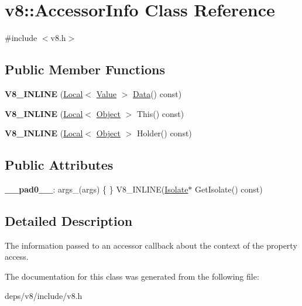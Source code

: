 \hypertarget{classv8_1_1_accessor_info}{}\section{v8\+:\+:Accessor\+Info Class Reference}
\label{classv8_1_1_accessor_info}


{\ttfamily \#include $<$v8.\+h$>$}

\subsection*{Public Member Functions}
\begin{DoxyCompactItemize}
\item 
\hypertarget{classv8_1_1_accessor_info_aaf108fa9b88e0c486d6c1e211422073a}{}{\bfseries V8\+\_\+\+I\+N\+L\+I\+N\+E} (\hyperlink{classv8_1_1_local}{Local}$<$ \hyperlink{classv8_1_1_value}{Value} $>$ \hyperlink{classv8_1_1_data}{Data}() const)\label{classv8_1_1_accessor_info_aaf108fa9b88e0c486d6c1e211422073a}

\item 
\hypertarget{classv8_1_1_accessor_info_ae25d9f1f25fe40f24fc39966632a2901}{}{\bfseries V8\+\_\+\+I\+N\+L\+I\+N\+E} (\hyperlink{classv8_1_1_local}{Local}$<$ \hyperlink{classv8_1_1_object}{Object} $>$ This() const)\label{classv8_1_1_accessor_info_ae25d9f1f25fe40f24fc39966632a2901}

\item 
\hypertarget{classv8_1_1_accessor_info_a805917deb22cf10270b844b498e73172}{}{\bfseries V8\+\_\+\+I\+N\+L\+I\+N\+E} (\hyperlink{classv8_1_1_local}{Local}$<$ \hyperlink{classv8_1_1_object}{Object} $>$ Holder() const)\label{classv8_1_1_accessor_info_a805917deb22cf10270b844b498e73172}

\end{DoxyCompactItemize}
\subsection*{Public Attributes}
\begin{DoxyCompactItemize}
\item 
\hypertarget{classv8_1_1_accessor_info_ac4db6a6ff509053620383df164726cf5}{}{\bfseries \+\_\+\+\_\+pad0\+\_\+\+\_\+}\+: args\+\_\+(args) \{ \} V8\+\_\+\+I\+N\+L\+I\+N\+E(\hyperlink{classv8_1_1_isolate}{Isolate}$\ast$ Get\+Isolate() const)\label{classv8_1_1_accessor_info_ac4db6a6ff509053620383df164726cf5}

\end{DoxyCompactItemize}


\subsection{Detailed Description}
The information passed to an accessor callback about the context of the property access. 

The documentation for this class was generated from the following file\+:\begin{DoxyCompactItemize}
\item 
deps/v8/include/v8.\+h\end{DoxyCompactItemize}
